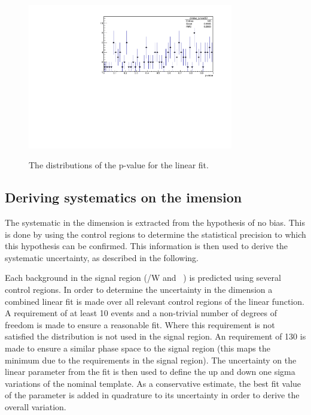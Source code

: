 \begin{figure}[h!]
  \centering
    \includegraphics[width=0.8\textwidth]{figures/template/linear/pValueAll.pdf}
  \\
  \caption{\label{fig:pValues} The distributions of the p-value for the linear fit.} 
\end{figure}
\subsection{Deriving systematics on the \texorpdfstring{\mht} dimension}
\label{sec:systMhtDimension}
The systematic in the \mht dimension is extracted from the hypothesis
of no bias. This is done by using the control regions 
to determine the statistical precision to which this hypothesis can
be confirmed. This information is then used to derive the systematic 
uncertainty, as described in the following. 

Each background in the signal region (\ttbar/W  and \zInv~) is predicted 
using several control regions. In order to determine the uncertainty in
the \mht dimension a combined linear fit is made over all relevant control regions
of the linear function. A requirement of at least 10 events and a non-trivial
number of degrees of freedom is made to ensure a reasonable fit. Where this
requirement is not satisfied the \mht distribution is not used in the signal region.
An \mht requirement of 130 \GeV is made to ensure a similar phase space to 
the signal region (this maps the minimum \mht due to the \alt requirements in the signal region).
The uncertainty on the linear parameter from the fit is then
used to define the up and down one sigma variations of the nominal template.
As a conservative estimate, the best fit value of the parameter is 
added in quadrature to its uncertainty in order to derive the overall variation.

